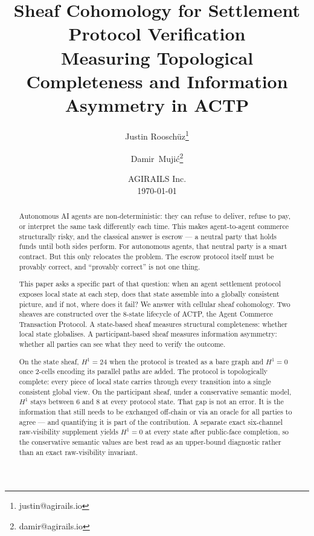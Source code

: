 \documentclass[11pt]{article}
\theoremstyle{plain}
\theoremstyle{definition}
\newcommand{\Hone}{H^{1}}
\begin{document}
\title{\textbf{Sheaf Cohomology for Settlement Protocol Verification}\\[4pt]
       \large Measuring Topological Completeness and Information Asymmetry in ACTP}

\author{
  Justin Roosch\"{u}z\thanks{justin@agirails.io}
  \and Damir~Mujić\thanks{damir@agirails.io}
}

\date{%
  AGIRAILS Inc. \\[4pt]
  \small \today
}

\maketitle

\begin{abstract}
Autonomous AI agents are non-deterministic: they can refuse to deliver, refuse
to pay, or interpret the same task differently each time.  This makes
agent-to-agent commerce structurally risky, and the classical answer is
escrow --- a neutral party that holds funds until both sides perform.  For
autonomous agents, that neutral party is a smart contract.  But this only
relocates the problem.  The escrow protocol itself must be provably correct,
and ``provably correct'' is not one thing.

This paper asks a specific part of that question: when an agent settlement
protocol exposes local state at each step, does that state assemble into a
globally consistent picture, and if not, where does it fail?  We answer with
cellular sheaf cohomology.  Two sheaves are constructed over the 8-state
lifecycle of ACTP, the Agent Commerce Transaction Protocol.  A state-based
sheaf measures structural completeness: whether local state globalises.  A
participant-based sheaf measures information asymmetry: whether all parties
can see what they need to verify the outcome.

On the state sheaf, $\Hone = 24$ when the protocol is treated as a bare
graph and $\Hone = 0$ once 2-cells encoding its parallel paths are added.
The protocol is topologically complete: every piece of local state carries
through every transition into a single consistent global view.  On the
participant sheaf, under a conservative semantic model, $\Hone$ stays between
6 and 8 at every protocol state.  That gap is not an error.  It is the
information that still needs to be exchanged off-chain or via an oracle for
all parties to agree --- and quantifying it is part of the contribution.
A separate exact six-channel raw-visibility supplement yields $\Hone = 0$ at
every state after public-face completion, so the conservative semantic
values are best read as an upper-bound diagnostic rather than an exact
raw-visibility invariant.


\end{abstract}
\end{document}
